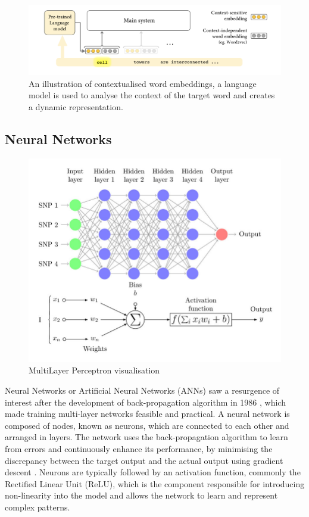 
\begin{figure}[htbp]
    \centering
    \includegraphics[width=0.9\linewidth]{images/contextualised_word_embeddings.png}
    \caption{An illustration of contextualised word embeddings, a language model is used to analyse the context of the target word and creates a dynamic representation. \cite{camacho-collados-2020-embeddings}}
    \label{fig:contextualised-word-embeddings}
\end{figure}


\subsection{Neural Networks}

\begin{figure}[htbp]
    \centering
    \includegraphics[width=0.9\linewidth]{images/mlp.png}
    \caption{MultiLayer Perceptron visualisation \cite{perez-enciso-2019-guide}}
    \label{fig:mlp}
\end{figure}

Neural Networks or Artificial Neural Networks (ANNs) saw a resurgence of interest after the development of back-propagation algorithm in 1986 \cite{rumelhart-1986-ann}, which made training multi-layer networks feasible and practical. A neural network is composed of nodes, known as neurons, which are connected to each other and arranged in layers. The network uses the back-propagation algorithm to learn from errors and continuously enhance its performance, by minimising the discrepancy between the target output and the actual output using gradient descent \cite{popescue-2009-mlp}. Neurons are typically followed by an activation function, commonly the Rectified Linear Unit (ReLU), which is the component responsible for introducing non-linearity into the model and allows the network to learn and represent complex patterns.

